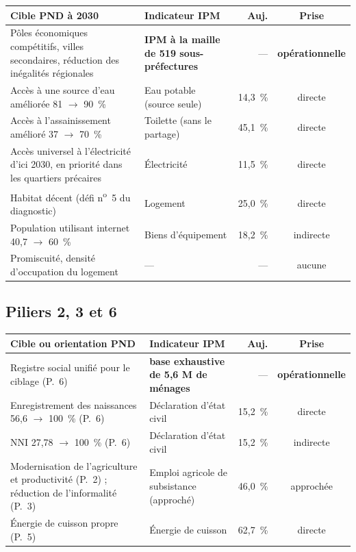 \documentclass[11pt,a4paper]{article}
\begin{document}
\begin{center}
\small
\begin{tabular}{@{}>{\RaggedRight}p{5.3cm}>{\RaggedRight}p{4.6cm}rc@{}}
\toprule
\textbf{Cible PND à 2030} & \textbf{Indicateur IPM} & \textbf{Auj.} & \textbf{Prise} \\
\midrule
Pôles économiques compétitifs, villes secondaires,
  réduction des inégalités régionales &
  \textbf{IPM à la maille de 519 sous-préfectures} & --- & \textbf{opérationnelle} \\
Accès à une source d'eau améliorée 81 $\to$ 90~\% & Eau potable (source seule) & 14,3~\% &
  directe \\
Accès à l'assainissement amélioré 37 $\to$ 70~\% & Toilette (sans le partage) & 45,1~\% &
  directe \\
Accès universel à l'électricité d'ici 2030, en priorité
  dans les quartiers précaires & Électricité & 11,5~\% & directe \\
Habitat décent (défi n\textsuperscript{o}~5 du diagnostic) & Logement & 25,0~\% & directe \\
Population utilisant internet 40,7 $\to$ 60~\% & Biens d'équipement & 18,2~\% & indirecte \\
Promiscuité, densité d'occupation du logement & --- & --- & aucune \\
\bottomrule
\end{tabular}
\end{center}

\subsection{Piliers 2, 3 et 6}

\begin{center}
\small
\begin{tabular}{@{}>{\RaggedRight}p{5.3cm}>{\RaggedRight}p{4.6cm}rc@{}}
\toprule
\textbf{Cible ou orientation PND} & \textbf{Indicateur IPM} & \textbf{Auj.} & \textbf{Prise} \\
\midrule
Registre social unifié pour le ciblage (P.~6) &
  \textbf{base exhaustive de 5,6 M de ménages} & --- & \textbf{opérationnelle} \\
Enregistrement des naissances 56,6 $\to$ 100~\% (P.~6) &
  Déclaration d'état civil & 15,2~\% & directe \\
NNI 27,78 $\to$ 100~\% (P.~6) & Déclaration d'état civil & 15,2~\% & indirecte \\
Modernisation de l'agriculture et productivité (P.~2) ;
  réduction de l'informalité (P.~3) &
  Emploi agricole de subsistance (approché) & 46,0~\% & approchée \\
Énergie de cuisson propre (P.~5) & Énergie de cuisson & 62,7~\% & directe \\
\bottomrule
\end{tabular}
\end{center}
\end{document}
